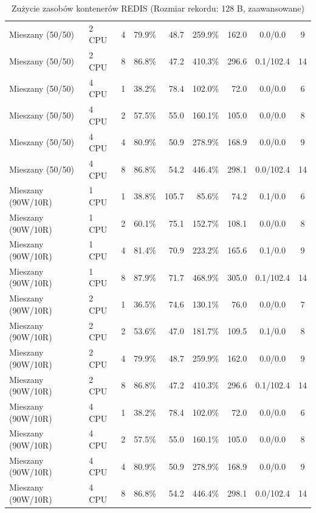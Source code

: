 \begin{table}[ht]
{\begin{tabular}{llcrrrrcc}
Mieszany (50/50) & 2 CPU & 4 & 79.9\% & 48.7 & 259.9\% & 162.0 & 0.0/0.0 & 9 \\
Mieszany (50/50) & 2 CPU & 8 & 86.8\% & 47.2 & 410.3\% & 296.6 & 0.1/102.4 & 14 \\
Mieszany (50/50) & 4 CPU & 1 & 38.2\% & 78.4 & 102.0\% & 72.0 & 0.0/0.0 & 6 \\
Mieszany (50/50) & 4 CPU & 2 & 57.5\% & 55.0 & 160.1\% & 105.0 & 0.0/0.0 & 8 \\
Mieszany (50/50) & 4 CPU & 4 & 80.9\% & 50.9 & 278.9\% & 168.9 & 0.0/0.0 & 9 \\
Mieszany (50/50) & 4 CPU & 8 & 86.8\% & 54.2 & 446.4\% & 298.1 & 0.0/102.4 & 14 \\
Mieszany (90W/10R) & 1 CPU & 1 & 38.8\% & 105.7 & 85.6\% & 74.2 & 0.1/0.0 & 6 \\
Mieszany (90W/10R) & 1 CPU & 2 & 60.1\% & 75.1 & 152.7\% & 108.1 & 0.0/0.0 & 8 \\
Mieszany (90W/10R) & 1 CPU & 4 & 81.4\% & 70.9 & 223.2\% & 165.6 & 0.1/0.0 & 9 \\
Mieszany (90W/10R) & 1 CPU & 8 & 87.9\% & 71.7 & 468.9\% & 305.0 & 0.1/102.4 & 14 \\
Mieszany (90W/10R) & 2 CPU & 1 & 36.5\% & 74.6 & 130.1\% & 76.0 & 0.0/0.0 & 7 \\
Mieszany (90W/10R) & 2 CPU & 2 & 53.6\% & 47.0 & 181.7\% & 109.5 & 0.1/0.0 & 8 \\
Mieszany (90W/10R) & 2 CPU & 4 & 79.9\% & 48.7 & 259.9\% & 162.0 & 0.0/0.0 & 9 \\
Mieszany (90W/10R) & 2 CPU & 8 & 86.8\% & 47.2 & 410.3\% & 296.6 & 0.1/102.4 & 14 \\
Mieszany (90W/10R) & 4 CPU & 1 & 38.2\% & 78.4 & 102.0\% & 72.0 & 0.0/0.0 & 6 \\
Mieszany (90W/10R) & 4 CPU & 2 & 57.5\% & 55.0 & 160.1\% & 105.0 & 0.0/0.0 & 8 \\
Mieszany (90W/10R) & 4 CPU & 4 & 80.9\% & 50.9 & 278.9\% & 168.9 & 0.0/0.0 & 9 \\
Mieszany (90W/10R) & 4 CPU & 8 & 86.8\% & 54.2 & 446.4\% & 298.1 & 0.0/102.4 & 14 \\
\bottomrule
\end{tabular}%
}
\caption{Zużycie zasobów kontenerów REDIS (Rozmiar rekordu: 128 B, zaawansowane)}
\label{tab:resources_redis_small_0}
\end{table}
